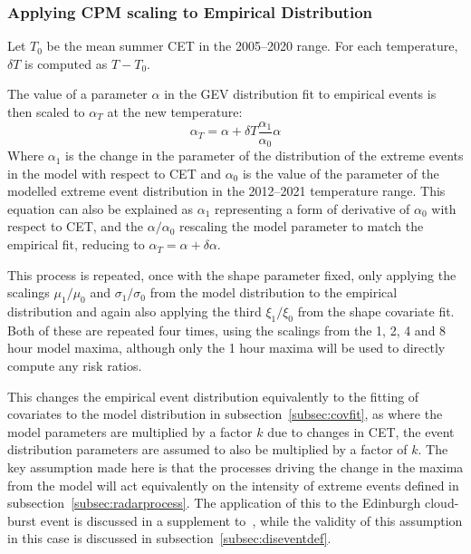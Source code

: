 \subsubsection{Applying CPM scaling to Empirical Distribution}

Let $T_0$ be the mean summer CET in the 2005--2020 range.
For each temperature, $\delta T$ is computed as $T - T_0$.

The value of a parameter $\alpha$ in the GEV distribution fit to empirical events is then scaled to $\alpha_T$ at the new temperature:
\begin{equation}\label{eq:newradarparams}
    \alpha_T = \alpha + \delta T \frac{\alpha_1}{\alpha_0} \alpha
\end{equation}
Where $\alpha_1$ is the change in the parameter of the distribution of the extreme events in the model with respect to CET and
    $\alpha_0$ is the value of the parameter of the modelled extreme event distribution in the 2012--2021 temperature range.
This equation can also be explained as $\alpha_1$ representing a form of derivative of $\alpha_0$ with respect to CET,
    and the $\alpha / \alpha_0$ rescaling the model parameter to match the empirical fit, reducing to
    $\alpha_T = \alpha + \delta \alpha$.

This process is repeated, once with the shape parameter fixed, only applying the scalings $\mu_1 / \mu_0$ and $\sigma_1 / \sigma_0$
    from the model distribution to the empirical distribution and again also applying the third $\xi_1 / \xi_0$ from the shape covariate fit.
Both of these are repeated four times, using the scalings from the 1, 2, 4 and 8 hour model maxima,
    although only the 1 hour maxima will be used to directly compute any risk ratios.

This changes the empirical event distribution equivalently to the fitting of covariates to the model distribution in subsection~\ref{subsec:covfit},
    as where the model parameters are multiplied by a factor $k$ due to changes in CET,
    the event distribution parameters are assumed to also be multiplied by a factor of $k$.
The key assumption made here is that the processes driving the change in the maxima from the model will act equivalently
    on the intensity of extreme events defined in subsection~\ref{subsec:radarprocess}.
The application of this to the Edinburgh cloud-burst event is discussed in a supplement to~\cite{Tett_Soon},
    while the validity of this assumption in this case is discussed in subsection~\ref{subsec:diseventdef}.

